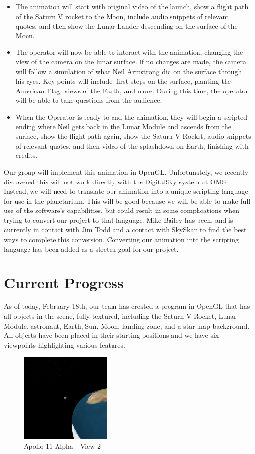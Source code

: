 \documentclass[onecolumn, draftclsnofoot,10pt, compsoc]{IEEEtran}
\begin{document}
\begin{itemize}
    \item The animation will start with original video of the launch, show a flight path of the Saturn V rocket to the Moon, include audio snippets of relevant quotes, and then show the Lunar Lander descending on the surface of the Moon.
    \item The operator will now be able to interact with the animation, changing the view of the camera on the lunar surface. If no changes are made, the camera will follow a simulation of what Neil Armstrong did on the surface through his eyes. Key points will include: first steps on the surface, planting the American Flag, views of the Earth, and more. During this time, the operator will be able to take questions from the audience. 
    \item When the Operator is ready to end the animation, they will begin a scripted ending where Neil gets back in the Lunar Module and ascends from the surface, show the flight path again, show the Saturn V Rocket, audio snippets of relevant quotes, and then video of the splashdown on Earth, finishing with credits. 
\end{itemize}

Our group will implement this animation in OpenGL. Unfortunately, we recently discovered this will not work directly with the DigitalSky system at OMSI. Instead, we will need to translate our animation into a unique scripting language for use in the planetarium. This will be good because we will be able to make full use of the software's capabilities, but could result in some complications when trying to convert our project to that language. Mike Bailey has been, and is currently in contact with Jim Todd and a contact with SkySkan to find the best ways to complete this conversion. Converting our animation into the scripting language has been added as a stretch goal for our project.

\section{Current Progress}
As of today, February 18th, our team has created a program in OpenGL that has all objects in the scene, fully textured, including the Saturn V Rocket, Lunar Module, astronaut, Earth, Sun, Moon, landing zone, and a star map background. All objects have been placed in their starting positions and we have six viewpoints highlighting various features.

\begin{figure}
    \includegraphics[width=0.4\textwidth]{View2.PNG} 
    \caption{Apollo 11 Alpha - View 2}
    \label{fig:View 2}
\end{figure}
\end{document}
